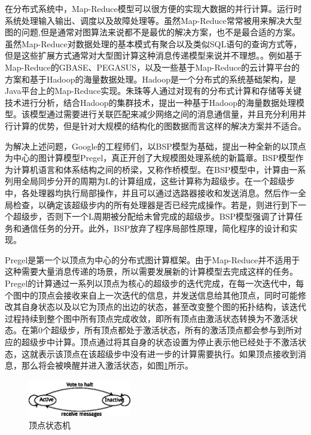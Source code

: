 在分布式系统中，Map-Reduce模型可以很方便的实现大数据的并行计算。运行时系统处理输入输出、调度以及故障处理等。虽然Map-Reduce常常被用来解决大型图的问题,但是通常对图算法来说都不是最优的解决方案，也不是最合适的方案。虽然Map-Reduce对数据处理的基本模式有聚合以及类似SQL语句的查询方式等，但是这些扩展方式通常对大型图计算这种消息传递模型来说并不理想。。例如基于Map-Reduce的GBASE\cite{kang2011gbase,kang2012gbase}、PEGASUS\cite{kang2009pegasus}，以及一些基于Map-Reduce的云计算平台的方案\cite{zhangxiangwang2011}和基于Hadoop的海量数据处理\cite{zhuzhu2008}。Hadoop是一个分布式的系统基础架构，是Java平台上的Map-Reduce实现。朱珠\cite{zhuzhu2008}等人通过对现有的分布式计算和存储等关键技术进行分析，结合Hadoop的集群技术，提出一种基于Hadoop的海量数据处理模型。该模型通过需要进行关联匹配来减少网络之间的消息通信量，并且充分利用并行计算的优势，但是针对大规模的结构化的图数据而言这样的解决方案并不适合。


为解决上述问题，Google的工程师们，以BSP\cite{valiant1990bridging}模型为基础，提出一种全新的以顶点为中心的图计算模型Pregel\cite{malewicz2010pregel}，真正开创了大规模图处理系统的新篇章。BSP模型作为计算机语言和体系结构之间的桥梁，又称作桥模型。在BSP模型中，计算由一系列用全局同步分开的周期为L的计算组成，这些计算称为超级步。在一个超级步中，各处理器均执行局部操作，并且可以通过选路器接收和发送消息。然后作一全局检查，以确定该超级步内的所有处理器是否已经完成操作。若是，则进行到下一个超级步，否则下一个L周期被分配给未曾完成的超级步。BSP模型强调了计算任务和通信任务的分开。此外，BSP放弃了程序局部性原理，简化程序的设计和实现。

Pregel\cite{malewicz2010pregel}是第一个以顶点为中心的分布式图计算框架。由于Map-Reduce并不适用于这种需要大量消息传递的场景，所以需要发展新的计算模型去完成这样的任务。Pregel的计算通过一系列以顶点为核心的超级步的迭代完成，在每一次迭代中，每个图中的顶点会接收来自上一次迭代的信息，并发送信息给其他顶点，同时可能修改其自身状态以及以它为顶点的出边的状态，甚至改变整个图的拓扑结构，该迭代过程持续到整个图中所有顶点完成收敛，即所有顶点由激活状态转换为不激活状态。在第0个超级步，所有顶点都处于激活状态，所有的激活顶点都会参与到所对应的超级步中计算。顶点通过将其自身的状态设置为停止表示他已经处于不激活状态，这就表示该顶点在该超级步中没有进一步的计算需要执行。如果顶点接收到消息，那么将会被唤醒并进入激活状态，如图\ref{fig:va}所示。

\begin{figure}[htbp]
\centering
\includegraphics[width=0.4\textwidth]{myfigures/vertexactive.eps}
\caption{顶点状态机}\label{fig:va}
\end{figure}

